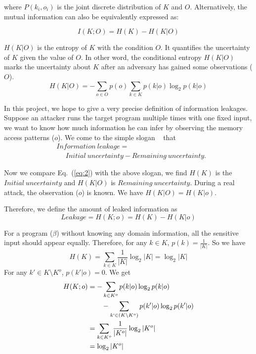 where $P(k_i, o_i)$ is the joint discrete distribution of $K$ and $O$.
Alternatively, the mutual information can also be equivalently expressed as:

\begin{equation} \label{eq:2}
    I(K;O) = H(K) - H(K|O)
\end{equation}

$H(K|O)$ is the entropy of $K$ with the condition $O$. It quantifies the
uncertainty of $K$ given the value of $O$. In other word, the conditional
entropy $H(K|O)$ marks the uncertainty about $K$ after an adversary has gained
some observations ($O$).
\begin{equation}
    H(K|O) = - \sum_{o {\in} O} {p(o) \sum_{k {\in} K}{p(k|o)\log_2p(k|o)}}
\end{equation}

In this project, we hope to give a very precise definition of information
leakages. Suppose an attacker runs the target program multiple times with one
fixed input, we want to know how much information he can infer by observing the
memory access patterns ($o$). We come to the simple slogan
~\cite{10.1007/978-3-642-00596-1_21} %
that
\begin{align*}
     & \mathit{Information\ leakage} =                                         \\
     & ~~~~~~ \mathit{Initial\ uncertainty} - \mathit{Remaining\ uncertainty}.
\end{align*}

Now we compare Eq.~(\ref{eq:2}) with the above slogan, we find $H(K)$
is the $\mathit{Initial\ uncertainty}$ and $H(K|O)$ is $\mathit{Remaining\
uncertainty}$. During a real attack, the observation ($o$) is known.  We
have $H(K|O) = H(K|o)$.

Therefore, we define the amount of leaked information as
\begin{displaymath}
    Leakage = H(K;o) = H(K) - H(K|o)
\end{displaymath}

For a program ($\beta$) without knowing any domain information, all the sensitive
input should appear equally. Therefore, for any $k \in K$, $p(k) =
\frac{1}{|K|}$. So we have
$$H(K) = \sum_{k {\in} K}\frac{1}{|K|}\log_2{|K|} = \log_2{|K|}$$
For any $k' \in K \setminus K^o$, $p(k'|o) = 0$. We get
\begin{align*}
    H(K;o) & = - \sum_{k {\in} K^o}{p(k|o)\log_2p(k|o)}                         \\
           & \qquad   - \sum_{k` {\in} (K \setminus K^o)}{p(k'|o)\log_2p(k'|o)} \\
           & = \sum_{k {\in} K^o}\frac{1}{|K^o|}\log_2{|K^o|}                   \\
           & = \log_2{|K^o|}
\end{align*}


